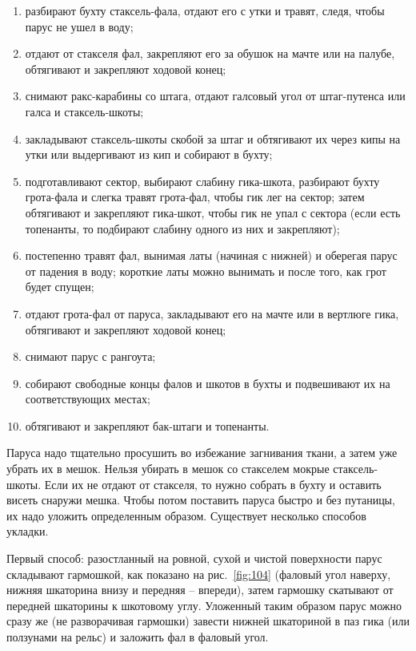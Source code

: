 \documentclass[a4paper, 12pt, twoside, final]{scrbook}
\begin{document}
\begin{enumerate}
\item разбирают бухту стаксель-фала, отдают его с утки и травят, следя, чтобы парус не ушел в воду;
\item отдают от стакселя фал, закрепляют его за обушок на мачте или на палубе, обтягивают и закрепляют ходовой конец;
\item снимают ракс-карабины со штага, отдают галсовый угол от штаг-путенса или галса и стаксель-шкоты;
\item закладывают стаксель-шкоты скобой за штаг и обтягивают их через кипы на утки или выдергивают из кип и собирают в бухту;
\item подготавливают сектор, выбирают слабину гика-шкота, разбирают бухту грота-фала и слегка травят грота-фал, чтобы гик лег на сектор; затем обтягивают и закрепляют гика-шкот, чтобы гик не упал с сектора (если есть топенанты, то подбирают слабину одного из них и закрепляют);
\item постепенно травят фал, вынимая латы (начиная с нижней) и оберегая парус от падения в воду; короткие латы можно вынимать и после того, как грот будет спущен;
\item отдают грота-фал от паруса, закладывают его на мачте или в вертлюге гика, обтягивают и закрепляют ходовой конец;
\item снимают парус с рангоута;
\item собирают свободные концы фалов и шкотов в бухты и подвешивают их на соответствующих местах;
\item обтягивают и закрепляют бак-штаги и топенанты.
\end{enumerate}

Паруса надо тщательно просушить во избежание загнивания ткани, а затем уже убрать их в мешок. Нельзя убирать в мешок со стакселем мокрые стаксель-шкоты. Если их не отдают от стакселя, то нужно собрать в бухту и оставить висеть снаружи мешка.
Чтобы потом поставить паруса быстро и без путаницы, их надо уложить определенным образом. Существует несколько способов укладки.

Первый способ: разостланный на ровной, сухой и чистой поверхности парус складывают гармошкой, как показано на рис.~\ref{fig:104} (фаловый угол наверху, нижняя шкаторина внизу и передняя \--- впереди), затем гармошку скатывают от передней шкаторины к шкотовому углу. Уложенный таким образом парус можно сразу же (не разворачивая гармошки) завести нижней шкаториной в паз гика (или ползунами на рельс) и заложить фал в фаловый угол.
\end{document}
